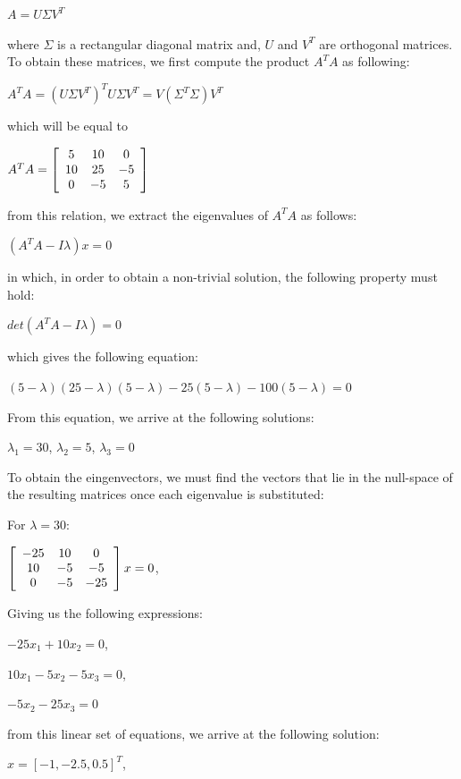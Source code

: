 \documentclass[]{article}
\begin{document}
\centerline { $A = U \Sigma V^T$}

where $\Sigma$ is a rectangular diagonal matrix and, $U$ and $V^T$ are orthogonal matrices. To obtain these matrices, we first compute the product $A^TA$ as following:

\centerline {
	$A^TA = (U \Sigma V^T)^T U \Sigma V^T = V (\Sigma^T \Sigma)V^T $ 
}
which will be equal to 

\centerline{ $A^TA = \left[ {\begin{array}{*{20}c}
		5 & 10 & 0 \\
		10 & 25 & -5 \\ 
		0 & -5 & 5   
		\end{array} } \right]$ }
	
from this relation, we extract the eigenvalues of $A^TA$ as follows:
	
\centerline {
	$(A^TA - I \lambda) x = 0$
}

in which, in order to obtain a non-trivial solution, the following property must hold:

\centerline {
	$det(A^TA - I \lambda) = 0$
}

which gives the following equation:

\centerline {
	$(5- \lambda) (25 - \lambda)(5 - \lambda) - 25(5 - \lambda) - 100(5 - \lambda) = 0 $
}

From this equation, we arrive at the following solutions: 

\centerline {
	$\lambda_{1} = 30$, $\lambda_{2} = 5$, $\lambda_{3} = 0$ 
}

To obtain the eingenvectors, we must find the vectors that lie in the null-space of the resulting matrices once
each eigenvalue is substituted:

For $\lambda = 30$: 

\centerline{ $\left[ {\begin{array}{*{20}c}
		-25 & 10 & 0 \\
		10 & -5 & -5 \\ 
		0 & -5 & -25   
		\end{array} } \right] x = 0$,  }

Giving us the following expressions: 

\centerline {
	$-25x_{1} + 10x_{2} = 0$, 
}
\centerline {
	$10x_{1} - 5x_{2} - 5x_{3} =0$, 
}
\centerline {
	$-5x_{2} - 25x_{3} = 0$	
}

from this linear set of equations, we arrive at the following solution: 

\centerline {
	$x = [-1, -2.5, 0.5]^T$,
}
\end{document}
